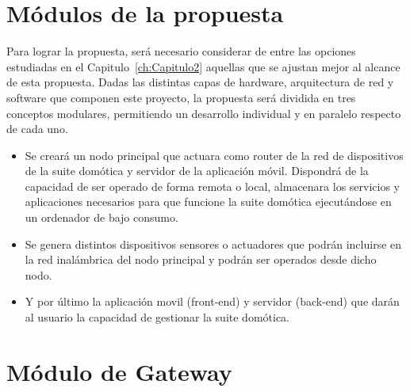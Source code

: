 \section{Módulos de la propuesta}
\label{ch:Capitulo3.1}
Para lograr la propuesta, será necesario considerar de entre las opciones estudiadas en el Capitulo~\ref{ch:Capitulo2} aquellas que se ajustan mejor al alcance de esta propuesta. Dadas las distintas capas de hardware, arquitectura de red y software que componen este proyecto, la propuesta será dividida en tres conceptos modulares, permitiendo un desarrollo individual y en paralelo respecto de cada uno.

\begin{itemize}

\item Se creará un nodo principal que actuara como router de la red de dispositivos de la suite domótica y servidor de la aplicación móvil. Dispondrá de la capacidad de ser operado de forma remota o local, almacenara los servicios y aplicaciones necesarios para que funcione la suite domótica ejecutándose en un ordenador de bajo consumo.

\item Se genera distintos dispositivos sensores o actuadores que podrán incluirse en la red inalámbrica del nodo principal y podrán ser operados desde dicho nodo.

\item Y por último la aplicación movil (front-end) y servidor (back-end) que darán al usuario la capacidad de gestionar la suite domótica.

\end{itemize}

\section{Módulo de Gateway}
\label{ch:Capitulo3.2}


